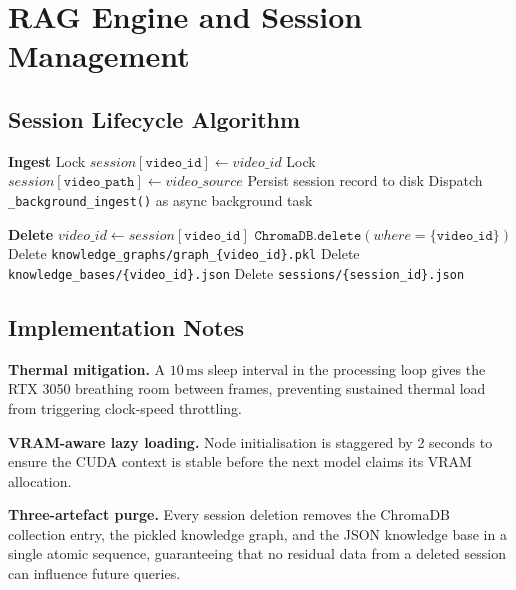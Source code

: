 \section{RAG Engine and Session Management}

\subsection{Session Lifecycle Algorithm}

\begin{algorithm}[H]
\caption{Session Lifecycle: Ingest and Delete}
\begin{algbox}
\begin{algorithmic}[1]

\Statex \textbf{Ingest}
\State Lock $session[\texttt{video\_id}] \gets video\_id$
\State Lock $session[\texttt{video\_path}] \gets video\_source$
\State Persist session record to disk
\State Dispatch \texttt{\_background\_ingest()} as async background task

\Statex

\Statex \textbf{Delete}
\State $video\_id \gets session[\texttt{video\_id}]$
\State $\texttt{ChromaDB.delete}(where=\{\texttt{video\_id}\})$
\State Delete \texttt{knowledge\_graphs/graph\_\{video\_id\}.pkl}
\State Delete \texttt{knowledge\_bases/\{video\_id\}.json}
\State Delete \texttt{sessions/\{session\_id\}.json}
\end{algorithmic}
\end{algbox}
\end{algorithm}

\subsection{Implementation Notes}

\textbf{Thermal mitigation.} A $10\,\text{ms}$ sleep interval in the processing loop gives the RTX 3050 breathing room between frames, preventing sustained thermal load from triggering clock-speed throttling.

\textbf{VRAM-aware lazy loading.} Node initialisation is staggered by 2 seconds to ensure the CUDA context is stable before the next model claims its VRAM allocation.

\textbf{Three-artefact purge.} Every session deletion removes the ChromaDB collection entry, the pickled knowledge graph, and the JSON knowledge base in a single atomic sequence, guaranteeing that no residual data from a deleted session can influence future queries.


